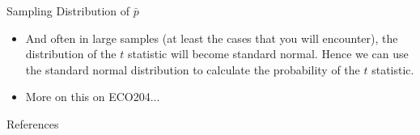 \documentclass[8pt, usepdftitle=false]{beamer}
\begin{document}
\begin{frame}[allowframebreaks]{Sampling Distribution of $\bar{p}$}
\begin{itemize}
    \begin{align*}
        t = \frac{\text{estimator} - \mathbb{E}\left(\text{estimator}\right)}{\left(\text{estimate of the standard error}\right)}
    \end{align*}

    \item And often in large samples (at least the cases that you will encounter), the distribution of the $t$ statistic will become standard normal. Hence we can use the standard normal distribution to calculate the probability of the $t$ statistic. 


    \item More on this on ECO204...



















\end{itemize}

\end{frame}






\begin{frame}[allowframebreaks]{References}
\vspace*{.3cm} 

\scriptsize


  

\end{frame}
\end{document}
